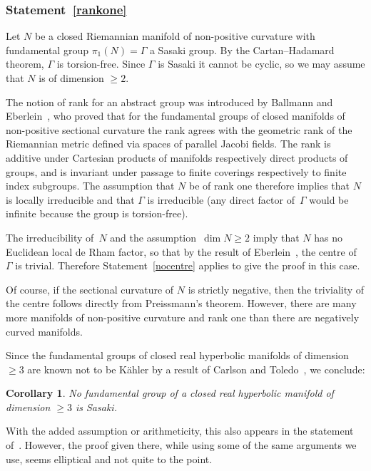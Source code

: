 \documentclass[12pt,leqno]{amsart}
\newtheorem{cor}[theor]{Corollary}
\begin{document}
\subsubsection*{Statement~\ref{rankone}}

Let $N$ be a closed Riemannian manifold of non-positive curvature with
fundamental group $\pi_1(N)=\Gamma$ a Sasaki group.
By the Cartan--Hadamard theorem, $\Gamma$ is torsion-free. Since $\Gamma$ is Sasaki it
cannot be cyclic, so we may assume that $N$ is of dimension $\geq 2$.

The notion of rank for an abstract group was introduced by Ballmann and Eberlein~\cite{BE},
who proved that for the fundamental groups of closed manifolds of non-positive
sectional curvature the rank agrees with the geometric rank of the
Riemannian metric defined via spaces of parallel Jacobi fields.
The rank is additive under Cartesian products of manifolds
  respectively direct products of groups, and is invariant under passage to
  finite coverings respectively to finite index subgroups. The
  assumption that $N$ be of rank one therefore implies that $N$ is
  locally irreducible and that $\Gamma$ is irreducible (any direct
  factor of~$\Gamma$ would be infinite because the group is
  torsion-free).

  The irreducibility of~$N$ and the assumption~$\dim N\geq 2$ imply
  that $N$ has no Euclidean local de Rham factor, so that by the
  result of Eberlein~\cite[p.~210f]{EbJDG}, the centre of~$\Gamma$
  is trivial. Therefore Statement~\ref{nocentre} applies to give the proof
  in this case.

Of course, if the sectional curvature of $N$ is strictly negative, then the triviality of the centre
follows directly from Preissmann's theorem. However, there are many more manifolds
of non-positive curvature and rank one than there are negatively curved manifolds.

Since the fundamental groups of closed real hyperbolic manifolds of dimension
$\geq 3$ are known not to be K\"ahler by a result of Carlson and Toledo~\cite[Theorem~8.1]{CT},
we conclude:
\begin{cor}\label{c:hyperbolic}
No fundamental group of a closed real hyperbolic manifold of
dimension $\geq 3$ is Sasaki.
\end{cor}
With the added assumption or arithmeticity, this also appears in the statement of~\cite[Proposition~5.4]{BFMT}.
However, the proof given there, while using some of the same arguments we use,
seems elliptical and not quite to the point.
\end{document}
